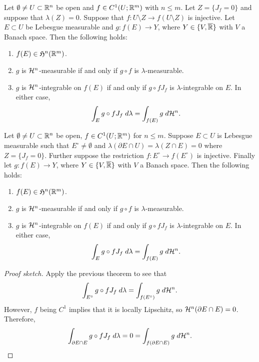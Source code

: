 \documentclass[a4paper]{article}
\begin{document}
\begin{thm}
Let $\emptyset \neq U \subset \mathbb{R}^n$ be open and $f \in C^1 
(U; \mathbb{R}^m)$ with $n \leq m$. Let $Z = \{J_f = 0\}$ and suppose 
that $\lambda (Z) = 0$. Suppose that $f : U \setminus Z 
\to f(U \setminus Z)$ is injective. Let $E \subset U$ be 
Lebesgue measurable and $g : f(E) \to Y$, where $Y 
\in \{V, \overline{\mathbb{R}}\}$ with $V$ a Banach space. Then the 
following holds: 
\begin{enumerate}
  \item $f(E) \in \mathfrak{H}^n(\mathbb{R}^m)$.
  \item $g$ is $\mathcal{H}^n$-measurable if and only if 
  $g \circ f$ is $\lambda$-measurable. 
  \item $g$ is $\mathcal{H}^n$-integrable on $f(E)$ if and only 
  if $g \circ f J_f$ is $\lambda$-integrable on $E$. 
  In either case, 
  \[
  \int_E g \circ f J_f \; d \lambda = \int_{f(E)} 
  g \; d \mathcal{H}^n.
  \]
\end{enumerate}
\end{thm}

\begin{thm}
Let $\emptyset \neq U \subset \mathbb{R}^n$ be open, $f \in C^1
(U ; \mathbb{R}^m)$ for $n \leq m$. Suppose $E \subset U$ is Lebesgue
measurable such that $E^\circ \neq \emptyset$ and
$\lambda (\partial E \cap U) = \lambda (Z \cap E) = 0$
where $Z = \{J_f = 0\}$. Further suppose
the restriction $f : E^\circ \to f(E^\circ)$ is injective.
Finally let $g : f(E) \to Y$, where $Y \in \{V, \overline{\mathbb{R}}\}$
with $V$ a Banach space. Then the following holds:
\begin{enumerate}
\item $f(E) \in \mathfrak{H}^n (\mathbb{R}^m)$.
\item $g$ is $\mathcal{H}^n$-measurable if and only if
$g \circ f$ is $\lambda$-measurable.
\item $g$ is $\mathcal{H}^n$-integrable on $f(E)$
if and only if $g \circ f J_f$ is $\lambda$-integrable
on $E$. In either case,
\[
\int_E g \circ f J_f  \; d \lambda
= \int_{f(E)} g \; d \mathcal{H}^n.
\]
\end{enumerate}
\end{thm}

\begin{proof}[Proof sketch]
Apply the previous theorem to see that
\[
\int_{E^\circ} g \circ f J_f \; d \lambda
= \int_{f(E^\circ)} g \; d \mathcal{H}^n.
\]
However, $f$ being $C^1$ implies that it is locally 
Lipschitz, so $\mathcal{H}^n (\partial E \cap E) = 0$. Therefore,
\[
\int_{\partial E \cap E} g \circ f J_f \; d \lambda
= 0 = \int_{f(\partial E \cap E)} g \; d \mathcal{H}^n.
\]
\end{proof}
\end{document}
